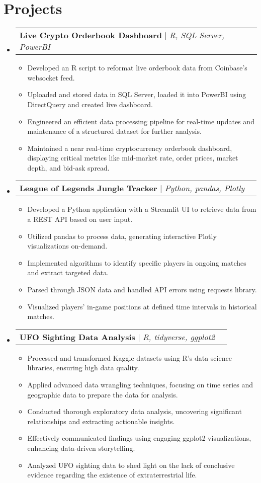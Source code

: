\documentclass[letterpaper,11pt]{article}
\makeatletter
\newcommand{\resumeItem}[1]{
  \item\small{
    {#1 \vspace{-2pt}}
  }
}
\newcommand{\resumeProjectHeading}[2]{
    \item
    \begin{tabular*}{0.97\textwidth}{l@{\extracolsep{\fill}}r}
      \small#1 & #2 \\
    \end{tabular*}\vspace{-7pt}
}
\newcommand{\resumeSubHeadingListStart}{\begin{itemize}[leftmargin=0.15in, label={}]}
\newcommand{\resumeSubHeadingListEnd}{\end{itemize}}
\newcommand{\resumeItemListStart}{\begin{itemize}}
\newcommand{\resumeItemListEnd}{\end{itemize}\vspace{-5pt}}
\makeatother
\begin{document}
\section{Projects}
\resumeSubHeadingListStart
    \resumeProjectHeading
        {\textbf{Live Crypto Orderbook Dashboard} $|$ \emph{R, SQL Server, PowerBI}}{}
        \resumeItemListStart
            \resumeItem{Developed an R script to reformat live orderbook data from Coinbase's websocket feed.}
            \resumeItem{Uploaded and stored data in SQL Server, loaded it into PowerBI using DirectQuery and created live dashboard.}
            \resumeItem{Engineered an efficient data processing pipeline for real-time updates and maintenance of a structured dataset for further analysis.}
            \resumeItem{Maintained a near real-time cryptocurrency orderbook dashboard, displaying critical metrics like mid-market rate, order prices, market depth, and bid-ask spread.}
        \resumeItemListEnd
        \resumeProjectHeading
        {\textbf{League of Legends Jungle Tracker} $|$ \emph{Python, pandas, Plotly}}{}
        \resumeItemListStart
            \resumeItem{Developed a Python application with a Streamlit UI to retrieve data from a REST API based on user input.}
            \resumeItem{Utilized pandas to process data, generating interactive Plotly visualizations on-demand.}
            \resumeItem{Implemented algorithms to identify specific players in ongoing matches and extract targeted data.}
            \resumeItem{Parsed through JSON data and handled API errors using requests library.}
            \resumeItem{Visualized players' in-game positions at defined time intervals in historical matches.}
        \resumeItemListEnd
    \resumeProjectHeading
        {\textbf{UFO Sighting Data Analysis} $|$ \emph{R, tidyverse, ggplot2}}{}
        \resumeItemListStart
            \resumeItem{Processed and transformed Kaggle datasets using R's data science libraries, ensuring high data quality.}
            \resumeItem{Applied advanced data wrangling techniques, focusing on time series and geographic data to prepare the data for analysis.}
            \resumeItem{Conducted thorough exploratory data analysis, uncovering significant relationships and extracting actionable insights.}
            \resumeItem{Effectively communicated findings using engaging ggplot2 visualizations, enhancing data-driven storytelling.}
            \resumeItem{Analyzed UFO sighting data to shed light on the lack of conclusive evidence regarding the existence of extraterrestrial life.}
        \resumeItemListEnd
\resumeSubHeadingListEnd
\end{document}
